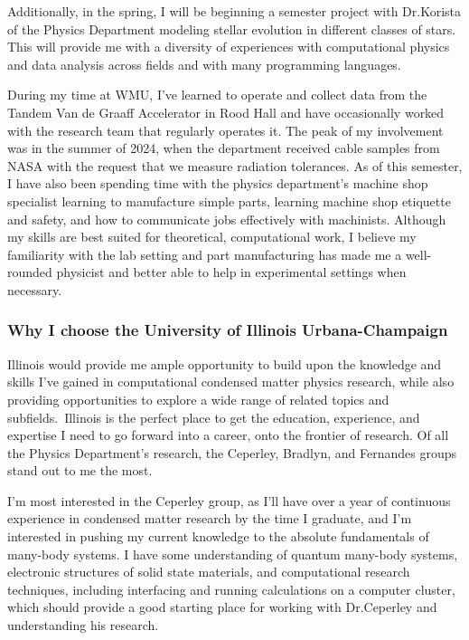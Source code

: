 \documentclass[11pt]{article}
\newcommand{\school}{University of Illinois Urbana-Champaign}
\newcommand{\schoolabbr}{Illinois}
\begin{document}
Additionally, in the spring, I will be beginning a semester project with Dr.\@ Korista of the Physics Department modeling stellar evolution in different classes of stars. This will provide me with a diversity of experiences with computational physics and data analysis across fields and with many programming languages.

During my time at WMU, I've learned to operate and collect data from the Tandem Van de Graaff Accelerator in Rood Hall and have occasionally worked with the research team that regularly operates it. The peak of my involvement was in the summer of 2024, when the department received cable samples from NASA with the request that we measure radiation tolerances. As of this semester, I have also been spending time with the physics department's machine shop specialist learning to manufacture simple parts, learning machine shop etiquette and safety, and how to communicate jobs effectively with machinists. Although my skills are best suited for theoretical, computational work, I believe my familiarity with the lab setting and part manufacturing has made me a well-rounded physicist and better able to help in experimental settings when necessary.
\pagebreak

\phantom{}
\vspace{-5em}
\subsubsection*{Why I choose the \school{}}
\schoolabbr{} would provide me ample opportunity to build upon the knowledge and skills I've gained in computational condensed matter physics research, while also providing opportunities to explore a wide range of related topics and subfields.\ \schoolabbr{} is the perfect place to get the education, experience, and expertise I need to go forward into a career, onto the frontier of research. Of all the Physics Department's research, the Ceperley, Bradlyn, and Fernandes groups stand out to me the most.

I'm most interested in the Ceperley group, as I'll have over a year of continuous experience in condensed matter research by the time I graduate, and I'm interested in pushing my current knowledge to the absolute fundamentals of many-body systems. I have some understanding of quantum many-body systems, electronic structures of solid state materials, and computational research techniques, including interfacing and running calculations on a computer cluster, which should provide a good starting place for working with Dr.\@ Ceperley and understanding his research.
\end{document}

